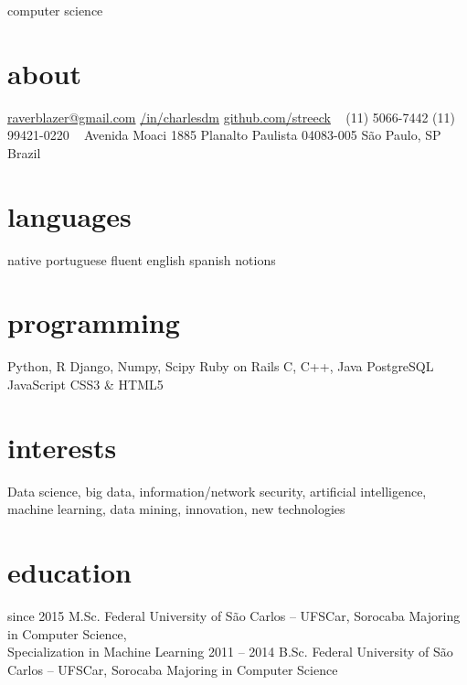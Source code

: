 \documentclass[]{friggeri-cv}
\begin{document}
       {computer science}


\begin{aside}
  \section{about}
    \href{mailto:raverblazer@gmail.com}{raverblazer@gmail.com}
    \href{http://www.linkedin.com/in/charlesdm}{\faLinkedinSign \space  /in/charlesdm}
    \href{https://github.com/streeck}{\faGithubSign \space github.com/streeck}
    ~
    (11) 5066-7442
    (11) 99421-0220
    ~
    Avenida Moaci 1885
    Planalto Paulista
    04083-005
    São Paulo, SP
    Brazil
  \section{languages}
    native portuguese
    fluent english
    spanish notions
  \section{programming}
    Python, R
    Django, Numpy, Scipy
    Ruby on Rails
    C, C++, Java
    PostgreSQL
    JavaScript
    CSS3 \& HTML5
\end{aside}

\section{interests}

Data science, big data, information/network security, artificial intelligence, machine learning, data mining, innovation, new technologies

\section{education}

\begin{entrylist}
  \entry
    {since 2015}
    {M.Sc.}
    {Federal University of São Carlos -- UFSCar, Sorocaba}
    {Majoring in Computer Science,\\
    Specialization in Machine Learning}
  \entry
    {2011 – 2014}
    {B.Sc.}
    {Federal University of São Carlos -- UFSCar, Sorocaba}
    {Majoring in Computer Science}
\end{entrylist}
\end{document}
